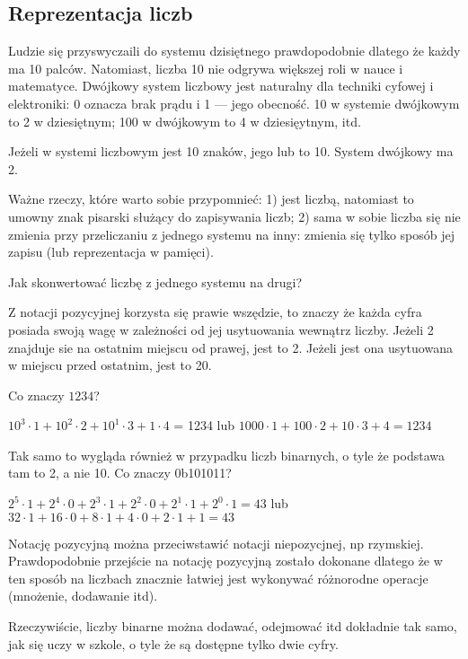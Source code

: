 \subsection{Reprezentacja liczb}

Ludzie się przyswyczaili do systemu dzisiętnego prawdopodobnie dlatego że każdy ma 10 palców.
Natomiast, liczba 10 nie odgrywa większej roli w nauce i matematyce.
Dwójkowy system liczbowy jest naturalny dla techniki cyfowej i elektroniki: 0 oznacza brak prądu i 1 --- jego obecność.
10 w systemie dwójkowym to 2 w dziesiętnym; 100 w dwójkowym to 4 w dziesięytnym, itd.

Jeżeli w systemi liczbowym jest 10 znaków, jego  lub  to 10.
System dwójkowy ma  2.

Ważne rzeczy, które warto sobie przypomnieć:
1)  jest liczbą, natomiast  to umowny znak pisarski służący do zapisywania liczb;
2) sama w sobie liczba się nie zmienia przy przeliczaniu z jednego systemu na inny: zmienia się tylko sposób jej zapisu (lub reprezentacja w pamięci).

Jak skonwertować liczbę z jednego systemu na drugi?

Z notacji pozycyjnej korzysta się prawie wszędzie, to znaczy że każda cyfra posiada swoją wagę w zależności od jej usytuowania wewnątrz liczby.
Jeżeli 2 znajduje sie na ostatnim miejscu od prawej, jest to 2.
Jeżeli jest ona usytuowana w miejscu przed ostatnim, jest to 20.

Co znaczy $1234$?

$10^3 \cdot 1 + 10^2 \cdot 2 + 10^1 \cdot 3 + 1 \cdot 4$ = 1234 lub
$1000 \cdot 1 + 100 \cdot 2 + 10 \cdot 3 + 4 = 1234$

Tak samo to wygląda również w przypadku liczb binarnych, o tyle że podstawa tam to 2, a nie 10.
Co znaczy 0b101011?

$2^5 \cdot 1 + 2^4 \cdot 0 + 2^3 \cdot 1 + 2^2 \cdot 0 + 2^1 \cdot 1 + 2^0 \cdot 1 = 43$ lub
$32 \cdot 1 + 16 \cdot 0 + 8 \cdot 1 + 4 \cdot 0 + 2 \cdot 1 + 1 = 43$

Notację pozycyjną można przeciwstawić notacji niepozycjnej, np rzymskiej.
Prawdopodobnie przejście na notację pozycyjną zostało dokonane dlatego że w ten sposób na liczbach znacznie łatwiej jest wykonywać różnorodne operacje (mnożenie, dodawanie itd).

Rzeczywiście, liczby binarne można dodawać, odejmować itd dokładnie tak samo, jak się uczy w szkole, o tyle że są dostępne tylko dwie cyfry.

